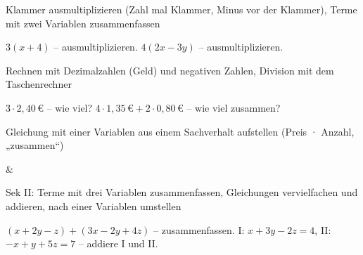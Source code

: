 \begin{aufgabe}{Klammer ausmultiplizieren (Zahl mal Klammer, Minus vor der Klammer), Terme mit zwei Variablen zusammenfassen}
\begin{teile}
\teil $3(x + 4)$ – ausmultiplizieren. \leerfeld
\teil $4(2x - 3y)$ – ausmultiplizieren. \leerfeld
\end{teile}
\end{aufgabe}

\begin{aufgabe}{Rechnen mit Dezimalzahlen (Geld) und negativen Zahlen, Division mit dem Taschenrechner}
\begin{teile}
\teil $3 \cdot 2{,}40\,€$ – wie viel? \leerfeld[€]
\teil $4 \cdot 1{,}35\,€ + 2 \cdot 0{,}80\,€$ – wie viel zusammen? \leerfeld[€]
\end{teile}
\end{aufgabe}

\begin{aufgabe}{Gleichung mit einer Variablen aus einem Sachverhalt aufstellen (Preis · Anzahl, „zusammen“)}
\begin{gleichungsraster}[2]
 &
 \\
\end{gleichungsraster}
\end{aufgabe}

\begin{aufgabe}{Sek II: Terme mit drei Variablen zusammenfassen, Gleichungen vervielfachen und addieren, nach einer Variablen umstellen}
\begin{teile}
\teil $(x + 2y - z) + (3x - 2y + 4z)$ – zusammenfassen. \leerfeld
\teil I: $x + 3y - 2z = 4$, II: $-x + y + 5z = 7$ – addiere I und II. \leerfeld
\end{teile}
\end{aufgabe}

